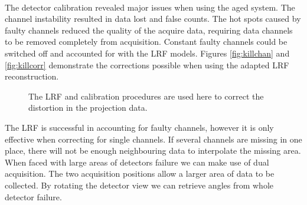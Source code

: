 \paragraph{}
The detector calibration revealed major issues when using the aged system. The channel instability resulted in data lost and false counts. The hot spots caused by faulty channels reduced the quality of the acquire data, requiring data channels to be removed completely from acquisition. Constant faulty channels could be switched off and accounted for with the \acrshort{LRF} models. Figures \ref{fig:killchan} and \ref{fig:killcorr} demonstrate the corrections possible when using the adapted \acrshort{LRF} reconstruction. 

\begin{figure}[!tbp]
  \centering
  \hfill
  \caption{The \acrshort{LRF} and calibration procedures are used here to correct the distortion in the projection data.}
\end{figure}

The \acrshort{LRF} is successful in accounting for faulty channels, however it is only effective when correcting for single channels. If several channels are missing in one place, there will not be enough neighbouring data to interpolate the missing area. When faced with large areas of detectors failure we can make use of dual acquisition. The two acquisition positions allow a larger area of data to be collected. By rotating the detector view we can retrieve angles from whole detector failure.
